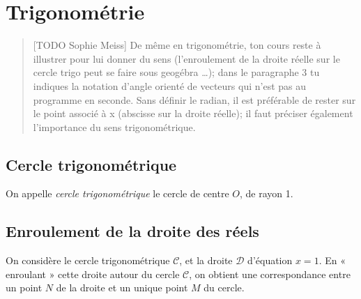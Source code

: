 \chapter{Trigonométrie}
\begin{quotation}[TODO Sophie Meiss]
De même en trigonométrie, ton cours reste à illustrer pour lui donner du 
sens (l'enroulement de la droite réelle sur le cercle trigo peut se 
faire sous geogébra \ldots); dans le paragraphe 3 tu indiques la notation 
d'angle orienté de vecteurs qui n'est pas au programme en seconde. Sans 
définir le radian, il est préférable de rester sur le point associé à x 
(abscisse sur la droite réelle); il faut préciser également l'importance 
du sens trigonométrique.
\end{quotation}

\section{Cercle trigonométrique}

\begin{multicols}{2}
\begin{definition}
  On appelle \emph{cercle trigonométrique} le cercle de centre $O$, de rayon 1.
\end{definition}

\begin{center}
\end{center}
\end{multicols}

\section{Enroulement de la droite des réels}

\begin{multicols}{2}
On considère le cercle trigonométrique $\mathcal C$, et la droite $\mathcal D$ d'équation $x=1$. En « enroulant » cette droite autour du cercle $\mathcal C$, on obtient une correspondance entre un point $N$ de la droite et un unique point $M$ du cercle.

\end{multicols}

